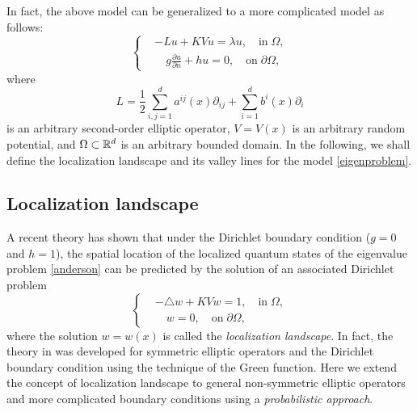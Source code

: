 \documentclass[a4paper,11pt]{article}
\begin{document}
In fact, the above model can be generalized to a more complicated model as follows:
\begin{equation}\label{eigenproblem}
\left\{
\begin{split}
& - L u + K V u = \lambda u, \quad\textrm{in}\;\Omega, \\
& \quad g \frac{\partial u}{\partial n} + h u = 0, \quad \textrm{on} \; \partial \Omega,
\end{split}
\right.
\end{equation}
where
\begin{equation}\label{operator}
L = \frac{1}{2} \sum_{i,j=1}^{d} a^{ij}(x) \partial_{ij} + \sum_{i=1}^{d} b^i(x) \partial_i
\end{equation}
is an arbitrary second-order elliptic operator, $V = V(x)$ is an arbitrary random potential, and $\Omega \subset \mathbb{R}^d$ is an arbitrary bounded domain. In the following, we shall define the localization landscape and its valley lines for the model \eqref{eigenproblem}.

\subsection{Localization landscape}
A recent theory \cite{filoche2012universal} has shown that under the Dirichlet boundary condition ($g = 0$ and $h = 1$), the spatial location of the localized quantum states of the eigenvalue problem \eqref{anderson} can be predicted by the solution of an associated Dirichlet problem
\begin{equation}\label{landDirichlet}
\left\{
\begin{split}
& -\triangle w + K V w = 1, \quad \textrm{in} \; \Omega, \\
& \quad w = 0, \quad \textrm{on} \; \partial \Omega,
\end{split}
\right.
\end{equation}
where the solution $w = w(x)$ is called the \emph{localization landscape}. In fact, the theory in \cite{filoche2012universal} was developed for symmetric elliptic operators and the Dirichlet boundary condition using the technique of the Green function. Here we extend the concept of localization landscape to general non-symmetric elliptic operators and more complicated boundary conditions using a \emph{probabilistic approach}.
\end{document}
